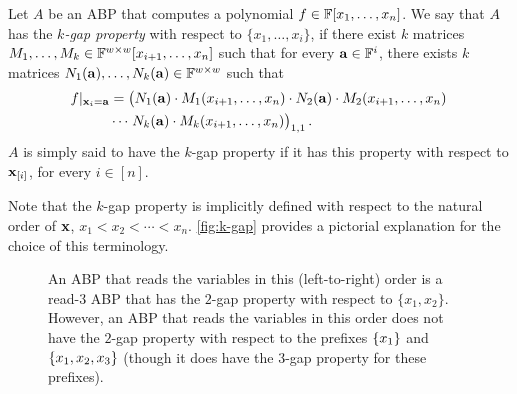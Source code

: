 \documentclass[11pt]{article}
\newcommand{\exi}{\vecx_{[i]}}
\begin{document}
\begin{definition}
\label{def:k-gap}
Let $A$ be an ABP that computes a polynomial $f \in \F[x_1, \ldots, x_n]$. We say that $A$ has the {\em $k$-gap property} with respect to $\{x_1, \ldots, x_i\}$, if there exist $k$ matrices $M_1, \ldots, M_k \in \F^{w \times w}[x_{i+1}, \ldots, x_n]$ such that for every $\veca \in \F^{i}$, there exists $k$ matrices $N_1(\veca), \ldots, N_{k}(\veca) \in \F^{w \times w}$ such that 
\begin{align}
\label{eq:k-gap}
f|_{\vecx_i = \veca} &= \left( \vphantom{M^{1,1}} N_1(\veca) \cdot M_1(x_{i+1},\ldots,x_n) \cdot N_2(\veca) \cdot M_2(x_{i+1},\ldots, x_n)\right. \nonumber\\
&\cdots \left. \vphantom{M^{1,1}}  N_k(\veca) \cdot  M_{k}(x_{i+1},\ldots,x_n) \right)_{1,1}.
\end{align}
$A$ is simply said to have the $k$-gap property if it has this property with respect to $\exi$, for every $i \in [n]$.
\end{definition}
Note that the $k$-gap property is implicitly defined with respect to the natural order of $\mathbf{x}$, $x_1 < x_2 < \cdots < x_n$.
\autoref{fig:k-gap} provides a pictorial explanation for the choice of this terminology.

\begin{figure}[h]
\begin{center}
\caption{An ABP that reads the variables in this (left-to-right) order is a read-$3$ ABP that has the $2$-gap property with respect to $\{x_1,x_2\}$.  However, an ABP that reads the variables in this order does not have the $2$-gap property with respect to the prefixes $\left\{ x_1 \right\}$ and $\left\{ x_1,x_2,x_3 \right\}$ (though it does have the $3$-gap property for these prefixes).}
\label{fig:k-gap}
\end{center}
\end{figure}
\end{document}
